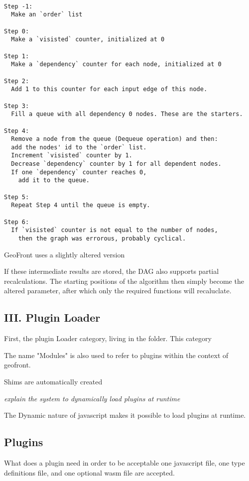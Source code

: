 \begin{lstlisting}

Step -1: 
  Make an `order` list

Step 0: 
  Make a `visisted` counter, initialized at 0

Step 1: 
  Make a `dependency` counter for each node, initialized at 0

Step 2: 
  Add 1 to this counter for each input edge of this node.

Step 3: 
  Fill a queue with all dependency 0 nodes. These are the starters.

Step 4: 
  Remove a node from the queue (Dequeue operation) and then:
  add the nodes' id to the `order` list.
  Increment `visisted` counter by 1.
  Decrease `dependency` counter by 1 for all dependent nodes.
  If one `dependency` counter reaches 0, 
    add it to the queue.

Step 5: 
  Repeat Step 4 until the queue is empty.

Step 6: 
  If `visisted` counter is not equal to the number of nodes, 
    then the graph was errorous, probably cyclical. 

\end{lstlisting}


GeoFront uses a slightly altered version



If these intermediate results are stored, the DAG also supports partial recalculations. The starting positions of the algorithm then simply become the altered parameter, after which only the required functions will recaluclate. 

 

\subsection*{III. Plugin Loader} 
First, the plugin Loader category, living in the  folder. This category 

The name "Modules" is also used to refer to plugins within the context of geofront.

Shims are automatically created

\emph{explain the system to dynamically load plugins at runtime}

The Dynamic nature of javascript makes it possible to load plugins at runtime. 



\subsection{ Plugins }
What does a plugin need in order to be acceptable
one javascript file, one type definitions file, and one optional wasm file are accepted. 

